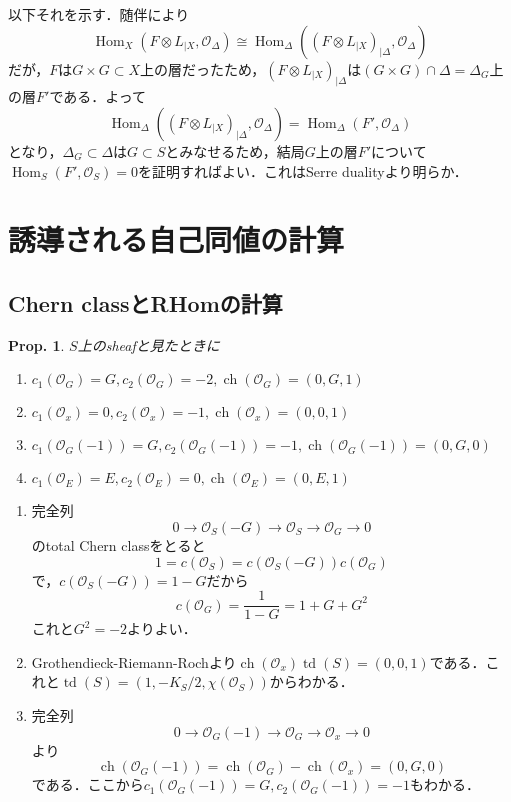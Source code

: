 \documentclass[uplatex,a4paper,11pt,dvipdfmx]{jsarticle}
\makeatletter
\theoremstyle{mystyle} %
\newtheorem{proposition}{Prop.}[section]
\renewenvironment{proof}[1][\proofname]{\par
 \pushQED{\qed}%
 \normalfont \topsep6\p@\@plus6\p@\relax
 \trivlist
 \item[\hskip\labelsep
 \itshape
 {\bf\underline{#1}}]\ignorespaces
}{%
 \popQED\endtrivlist\@endpefalse
}
\DeclareMathOperator{\Hom}{Hom}
\DeclareMathOperator{\ch}{ch}
\DeclareMathOperator{\td}{td}
\makeatother
\begin{document}
\begin{proof}
	以下それを示す．随伴により$$\Hom_X(F\otimes L_{|X}, \mathcal{O}_\Delta)\cong\Hom_\Delta((F\otimes L_{|X})_{|\Delta}, \mathcal{O}_\Delta)$$だが，$F$は$G \times G \subset X$上の層だったため，$(F\otimes L_{|X})_{|\Delta}$は$(G \times G) \cap \Delta = \Delta_G$上の層$F'$である．よって$$\Hom_\Delta((F\otimes L_{|X})_{|\Delta}, \mathcal{O}_\Delta)=\Hom_\Delta(F', \mathcal{O}_\Delta)$$となり，$\Delta_G \subset \Delta$は$G \subset S$とみなせるため，結局$G$上の層$F'$について$\Hom_S(F', \mathcal{O}_S)=0$を証明すればよい．これはSerre dualityより明らか．
\end{proof}

\section{誘導される自己同値の計算}
\subsection{Chern classとRHomの計算}
\begin{proposition}
	$S$上のsheafと見たときに
	\begin{enumerate}
		\item $c_1(\mathcal{O}_G) = G, c_2(\mathcal{O}_G) = -2, \ch(\mathcal{O}_G) = (0, G, 1)$

		\item $c_1(\mathcal{O}_x) = 0, c_2(\mathcal{O}_x) = -1, \ch(\mathcal{O}_x) = (0, 0, 1)$
		\item $c_1(\mathcal{O}_G(-1)) = G, c_2(\mathcal{O}_G(-1)) = -1, \ch(\mathcal{O}_G(-1)) = (0, G, 0)$
		\item $c_1(\mathcal{O}_E) = E, c_2(\mathcal{O}_E) = 0, \ch(\mathcal{O}_E) = (0, E, 1)$
	\end{enumerate}
\end{proposition}
\begin{proof}
	\begin{enumerate}
		\item 完全列$$0 \to \mathcal{O}_S(-G) \to \mathcal{O}_S \to \mathcal{O}_G \to 0$$のtotal Chern classをとると$$1 = c(\mathcal{O}_S) = c(\mathcal{O}_S(-G))c(\mathcal{O}_G)$$で，$c(\mathcal{O}_S(-G)) = 1-G$だから$$c(\mathcal{O}_G) = \frac{1}{1-G} = 1+G+G^2$$これと$G^2=-2$よりよい．

		\item Grothendieck-Riemann-Rochより$\ch(\mathcal{O}_x)\td(S) = (0, 0, 1)$である．これと$\td(S) = (1, -K_S/2, \chi(\mathcal{O}_S))$からわかる．
		\item 完全列$$0 \to \mathcal{O}_G(-1) \to \mathcal{O}_G \to \mathcal{O}_x \to 0$$より$$\ch( \mathcal{O}_G(-1)) = \ch(\mathcal{O}_G) - \ch(\mathcal{O}_x) = (0, G, 0)$$である．ここから$c_1(\mathcal{O}_G(-1)) = G, c_2(\mathcal{O}_G(-1)) = -1$もわかる．
	\end{enumerate}
\end{proof}
\end{document}
